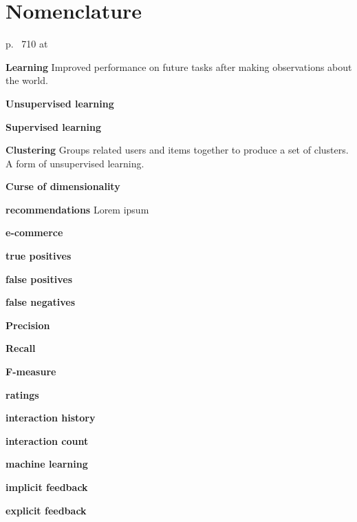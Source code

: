 \chapter{Nomenclature}\label{cha:def}

p. ~710 at \citep{norvigAI}

\textbf{Learning} Improved performance on future tasks after making observations about the world.

\textbf{Unsupervised learning}

\textbf{Supervised learning}

\textbf{Clustering} Groups related users and items together to produce a set of clusters. A form of unsupervised learning. 

\textbf{Curse of dimensionality}

\vspace{2cm}


\textbf{recommendations} Lorem ipsum

\textbf{e-commerce}

\textbf{true positives}

\textbf{false positives}

\textbf{false negatives}

\textbf{Precision}

\textbf{Recall}

\textbf{F-measure}

\textbf{ratings}

\textbf{interaction history}

\textbf{interaction count}

\textbf{machine learning}

\textbf{implicit feedback}

\textbf{explicit feedback}

